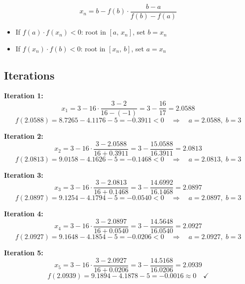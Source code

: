 \documentclass[12pt]{article}
\begin{document}
\vspace{8pt}

\begin{formulabox}
\[
  x_n = b - f(b)\cdot\frac{b - a}{f(b) - f(a)}
\]
\vspace{-4pt}
\begin{itemize}[noitemsep, topsep=4pt]
  \item If $f(a)\cdot f(x_n)<0$\;: root in $[a,\,x_n]$, set $b=x_n$
  \item If $f(x_n)\cdot f(b)<0$\;: root in $[x_n,\,b]$, set $a=x_n$
\end{itemize}
\end{formulabox}

\vspace{6pt}
\subsection*{Iterations}

\medskip
\noindent\textbf{Iteration 1:}
\[
  x_1 = 3 - 16\cdot\frac{3-2}{16-(-1)} = 3 - \frac{16}{17} = 2.0588
\]
\[
  f(2.0588) = 8.7265 - 4.1176 - 5 = -0.3911 < 0
  \quad\Rightarrow\quad a = 2.0588,\; b = 3
\]

\medskip
\noindent\textbf{Iteration 2:}
\[
  x_2 = 3 - 16\cdot\frac{3-2.0588}{16+0.3911} = 3 - \frac{15.0588}{16.3911} = 2.0813
\]
\[
  f(2.0813) = 9.0158 - 4.1626 - 5 = -0.1468 < 0
  \quad\Rightarrow\quad a = 2.0813,\; b = 3
\]

\medskip
\noindent\textbf{Iteration 3:}
\[
  x_3 = 3 - 16\cdot\frac{3-2.0813}{16+0.1468} = 3 - \frac{14.6992}{16.1468} = 2.0897
\]
\[
  f(2.0897) = 9.1254 - 4.1794 - 5 = -0.0540 < 0
  \quad\Rightarrow\quad a = 2.0897,\; b = 3
\]

\medskip
\noindent\textbf{Iteration 4:}
\[
  x_4 = 3 - 16\cdot\frac{3-2.0897}{16+0.0540} = 3 - \frac{14.5648}{16.0540} = 2.0927
\]
\[
  f(2.0927) = 9.1648 - 4.1854 - 5 = -0.0206 < 0
  \quad\Rightarrow\quad a = 2.0927,\; b = 3
\]

\medskip
\noindent\textbf{Iteration 5:}
\[
  x_5 = 3 - 16\cdot\frac{3-2.0927}{16+0.0206} = 3 - \frac{14.5168}{16.0206} = 2.0939
\]
\[
  f(2.0939) = 9.1894 - 4.1878 - 5 = -0.0016 \approx 0 \quad\checkmark
\]
\end{document}
